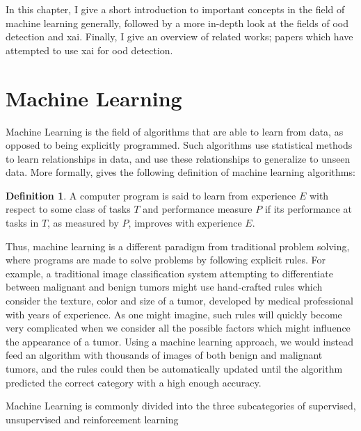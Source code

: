 \documentclass[UKenglish]{uiomasterthesis} %
\theoremstyle{definition}
\newtheorem*{definition}{Definition}
\begin{document}
In this chapter, I give a short introduction to important concepts in the field of machine learning generally, followed by a more in-depth look at the fields of \ac{ood} detection and \ac{xai}. Finally, I give an overview of related works; papers which have attempted to use \ac{xai} for \ac{ood} detection.

\section{Machine Learning}

Machine Learning is the field of algorithms that are able to learn from data, as opposed to being explicitly programmed. Such algorithms use statistical methods to learn relationships in data, and use these relationships to generalize to unseen data. More formally, \cite{mitchell} gives the following definition of machine learning algorithms:

\begin{definition}
A computer program is said to learn from experience $E$ with respect to some class of tasks $T$ and performance measure $P$ if its performance at tasks in $T$, as measured by $P$, improves with experience $E$.
\end{definition}

Thus, machine learning is a different paradigm from traditional problem solving, where programs are made to solve problems by following explicit rules. For example, a traditional image classification system attempting to differentiate between malignant and benign tumors might use hand-crafted rules which consider the texture, color and size of a tumor, developed by medical professional with years of experience. As one might imagine, such rules will quickly become very complicated when we consider all the possible factors which might influence the appearance of a tumor. Using a machine learning approach, we would instead feed an algorithm with thousands of images of both benign and malignant tumors, and the rules could then be automatically updated until the algorithm predicted the correct category with a high enough accuracy.

Machine Learning is commonly divided into the three subcategories of supervised, unsupervised and reinforcement learning

\end{document}
